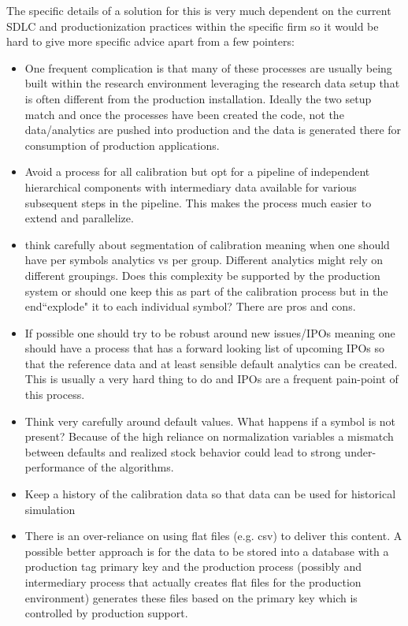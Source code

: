 The specific details of a solution for this is very much dependent on the current SDLC and productionization practices within the specific firm so it would be hard to give more specific advice apart from a few pointers:
\begin{itemize}
\item One frequent complication is that many of these processes are usually being built within the research environment leveraging the research data setup that is often different from the production installation. Ideally the two setup match and once the processes have been created the code, not the data/analytics are pushed into production and the data is generated there for consumption of production applications.
\item Avoid a  process for all calibration but opt for a pipeline of independent hierarchical components with intermediary data available for various subsequent steps in the pipeline. This makes the process much easier to extend and parallelize. 
\item think carefully about segmentation of calibration meaning when one should have per symbols analytics vs per group. Different analytics might rely on different groupings. Does this complexity be supported by the production system or should one keep this as part of the calibration process but in the end``explode" it to each individual symbol? There are pros and cons.
\item If possible one should try to be robust around new issues/IPOs meaning one should have a process that has a forward looking list of upcoming IPOs so that the reference data and at least sensible default analytics can be created. This is usually a very hard thing to do and IPOs are a frequent pain-point of this process.
\item Think very carefully around default values. What happens if a symbol is not present? Because of the high reliance on normalization variables a mismatch between defaults and realized stock behavior could lead to strong under-performance of the algorithms.
\item Keep a history of the calibration data so that data can be used for historical simulation
\item There is an over-reliance on using flat files (e.g. csv) to deliver this content. A possible better approach is for the data to be stored into a database with a production tag primary key and the production process (possibly and intermediary process that actually creates flat files for the production environment) generates these files based on the primary key which is controlled by production support. 
\end{itemize}


